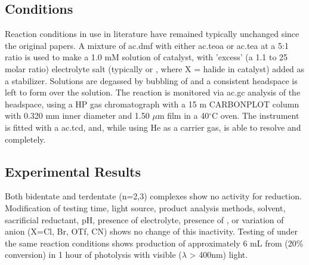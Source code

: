 \subsection{Conditions}

Reaction conditions in use in literature have remained typically unchanged since the original papers. A mixture of \gls{ac.dmf} with either \gls{ac.teoa} or \gls{ac.tea} at a 5:1 ratio is used to make a 1.0 mM solution of catalyst, with 'excess' (a 1.1 to 25 molar ratio) electrolyte salt (typically  or , where X = halide in catalyst) added as a stabilizer. Solutions are degassed by bubbling of  and a consistent headspace is left to form over the solution. The reaction is monitored via \gls{ac.gc} analysis of the headspace, using a HP gas chromatograph with a 15 m CARBONPLOT column with 0.320 mm inner diameter and 1.50 $\mu$m film in a 40$^\circ$C oven. The instrument is fitted with a \gls{ac.tcd}, and, while using He as a carrier gas, is able to resolve  and  completely.  

\subsection{Experimental Results}

Both bidentate and terdentate  (n=2,3) complexes show no activity for  reduction. Modification of testing time, light source, product analysis methods, solvent, sacrificial reductant, pH, presence of electrolyte, presence of , or variation of anion (X=Cl, Br, OTf, CN) shows no change of this inactivity. Testing of  under the same reaction conditions shows production of approximately 6 mL  from  (20\% conversion) in 1 hour of photolysis with visible ($\lambda$ > 400nm) light.



